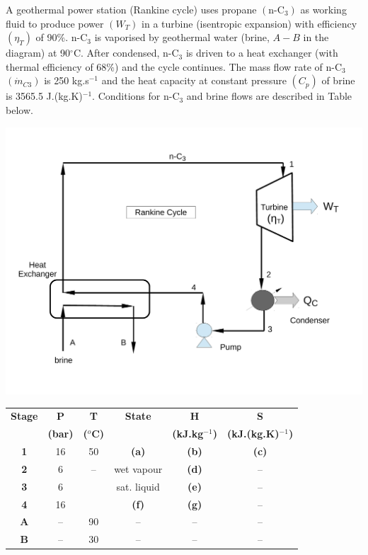 \documentclass[calculator,steamtables,allquestions,datasheet]{exam_newMarcus2}
\begin{document}
\begin{question}
%
A geothermal power station (Rankine cycle) uses propane $\left(\text{n-C}_{3}\right)$ as working fluid to produce power $\left(W_{T}\right)$ in a turbine (isentropic expansion) with efficiency $\left(\eta_{T}\right)$ of 90$\%$. n-C$_{3}$ is vaporised by geothermal water (brine, $A-B$ in the diagram) at 90$^{\circ}$C. After condensed, n-C$_{3}$ is driven to a heat exchanger (with thermal efficiency of 68$\%$) and the cycle continues. The mass flow rate of n-C$_{3}$ $\left(\dot{m}_{C3}\right)$ is 250 kg.s$^{-1}$ and the heat capacity at constant pressure $\left(C_{p}\right)$ of brine is 3565.5 J.(kg.K)$^{-1}$. Conditions for n-C$_{3}$ and brine flows are described in Table below.
\begin{center}
\includegraphics[width=10.cm,height=7.cm,clip]{./Pics/RankineCycle}
\end{center}
\begin{center}
\begin{tabular} {||c | c c c c c || }
\hline\hline
{\bf Stage} & {\bf P}    & {\bf T}        & {\bf State}    & {\bf H}             & {\bf S}                  \\
            & {\bf (bar)}& {\bf ($^{o}$C)} &               & {\bf (kJ.kg$^{-1}$)} & {\bf (kJ.(kg.K)$^{-1}$)}  \\
\hline\hline
 {\bf 1 }   & 16         & 50             &   {\bf (a)}    & {\bf (b)}           & {\bf (c)}                \\
 {\bf 2 }   & 6          &  --            &   wet vapour   & {\bf (d)}           & --                       \\
 {\bf 3 }   & 6          &                &   sat. liquid  & {\bf (e)}           & --                       \\
 {\bf 4 }   & 16         &                &   {\bf (f)}    & {\bf (g)}           & --                       \\
 {\bf A }   & --         & 90             &   --           & --                  & --                       \\
 {\bf B }   & --         & 30             &   --           & --                  & --                       \\
 \hline\hline
\end{tabular}
\end{center}


\end{question}
\end{document}
